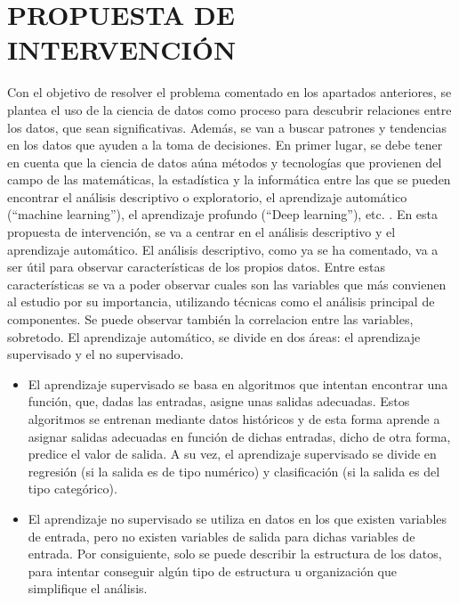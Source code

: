 \documentclass[spanish,12pt, a4paper,twoside]{paper}
\let\oldsection\section
\def\section{\cleardoublepage\oldsection}
\begin{document}
\section{PROPUESTA DE INTERVENCIÓN}
\justify
Con el objetivo de resolver el problema comentado en los apartados anteriores, se plantea el uso de la ciencia de datos como proceso para descubrir relaciones entre los datos, que sean significativas. Además, se van a buscar patrones y tendencias en los datos que ayuden a la toma de decisiones.
\justify
En primer lugar, se debe tener en cuenta que la ciencia de datos aúna métodos y tecnologías que provienen del campo de las matemáticas, la estadística y la informática entre las que se pueden encontrar el análisis descriptivo o exploratorio, el aprendizaje automático (“machine learning”), el aprendizaje profundo (“Deep learning”), etc. \cite{Marin2018}. En esta propuesta de intervención, se va a centrar en el análisis descriptivo y el aprendizaje automático.
\justify
El análisis descriptivo, como ya se ha comentado, va a ser útil para observar características de los propios datos. Entre estas características se va a poder observar cuales son las variables que más convienen al estudio por su importancia, utilizando técnicas como el análisis principal de componentes. Se puede observar también la correlacion entre las variables, sobretodo.
\justify
El aprendizaje automático, se divide en dos áreas: el aprendizaje supervisado y el no supervisado. 
\justify
\begin{itemize}
\item El aprendizaje supervisado se basa en algoritmos que intentan encontrar una función, que, dadas las entradas, asigne unas salidas adecuadas. Estos algoritmos se entrenan mediante datos históricos y de esta forma aprende a asignar salidas adecuadas en función de dichas entradas, dicho de otra forma, predice el valor de salida. A su vez, el aprendizaje supervisado se divide en regresión (si la salida es de tipo numérico) y clasificación (si la salida es del tipo categórico). \cite{Recuero2017}
\item El aprendizaje no supervisado se utiliza en datos en los que existen variables de entrada, pero no existen variables de salida para dichas variables de entrada. Por consiguiente, solo se puede describir la estructura de los datos, para intentar conseguir algún tipo de estructura u organización que simplifique el análisis.\cite{Recuero2017}
\end{itemize}
\end{document}
